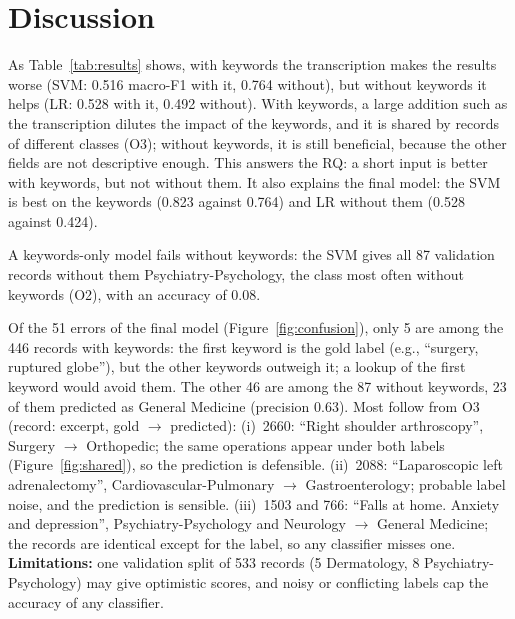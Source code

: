\documentclass[twocolumn,10pt]{article}
\begin{document}
\section{Discussion}
\label{sec:discussion}

As Table~\ref{tab:results} shows, with keywords the transcription makes the results worse (\ac{SVM}: 0.516 macro-F1 with it, 0.764 without), but without keywords it helps (\ac{LR}: 0.528 with it, 0.492 without). With keywords, a large addition such as the transcription dilutes the impact of the keywords, and it is shared by records of different classes (O3); without keywords, it is still beneficial, because the other fields are not descriptive enough. This answers the \acs{RQ}: a short input is better with keywords, but not without them. It also explains the final model: the \ac{SVM} is best on the keywords (0.823 against 0.764) and \ac{LR} without them (0.528 against 0.424).

A keywords-only model fails without keywords: the \ac{SVM} gives all 87 validation records without them Psychiatry-Psychology, the class most often without keywords (O2), with an accuracy of 0.08.

Of the 51 errors of the final model (Figure~\ref{fig:confusion}), only 5 are among the 446 records with keywords: the first keyword is the gold label (e.g., ``surgery, ruptured globe''), but the other keywords outweigh it; a lookup of the first keyword would avoid them. The other 46 are among the 87 without keywords, 23 of them predicted as General Medicine (precision 0.63). Most follow from O3 (record: excerpt, gold $\rightarrow$ predicted): (i)~2660: ``Right shoulder arthroscopy'', Surgery $\rightarrow$ Orthopedic; the same operations appear under both labels (Figure~\ref{fig:shared}), so the prediction is defensible. (ii)~2088: ``Laparoscopic left adrenalectomy'', Cardiovascular-Pulmonary $\rightarrow$ Gastroenterology; probable label noise, and the prediction is sensible. (iii)~1503 and 766: ``Falls at home. Anxiety and depression'', Psychiatry-Psychology and Neurology $\rightarrow$ General Medicine; the records are identical except for the label, so any classifier misses one. \textbf{Limitations:} one validation split of 533 records (5 Dermatology, 8 Psychiatry-Psychology) may give optimistic scores, and noisy or conflicting labels cap the accuracy of any classifier.
\end{document}

